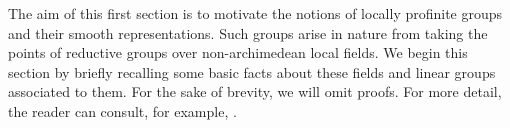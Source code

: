 The aim of this first section is to motivate the notions of locally profinite groups and their smooth representations. Such groups arise in nature from taking the points of reductive groups over non-archimedean local fields. We begin this section by briefly recalling some basic facts about these fields and linear groups associated to them. For the sake of brevity, we will omit proofs. For more detail, the reader can consult, for example, \cite{Gou1}.






\newpage

